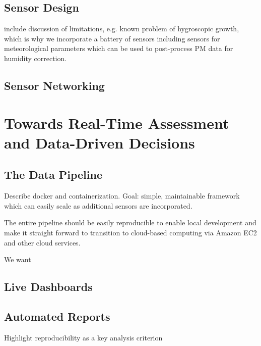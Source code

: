 \subsection{Sensor Design}

include discussion of limitations, e.g. known problem of hygroscopic growth,
which is why we incorporate a battery of sensors including sensors for
meteorological parameters which can be used to post-process PM data for humidity correction.

\subsection{Sensor Networking}

\section{Towards Real-Time Assessment and Data-Driven Decisions}


\subsection{The Data Pipeline}

Describe docker and containerization. Goal: simple, maintainable framework which
can easily scale as additional sensors are incorporated.

The entire pipeline should be easily reproducible to enable local development
and make it straight forward to transition to cloud-based computing via Amazon
EC2 and other cloud services.

We want


\subsection{Live Dashboards}


\subsection{Automated Reports}

Highlight reproducibility as a key analysis criterion


